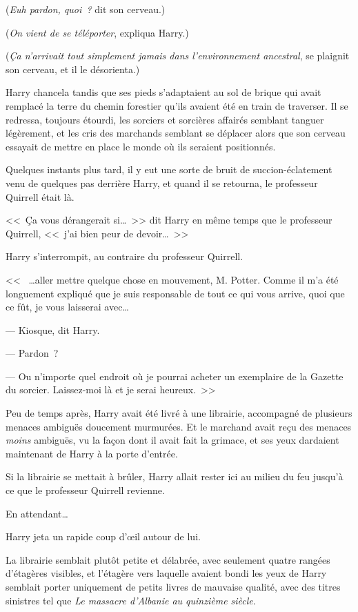 (\emph{Euh pardon, quoi~?} dit son cerveau.)

(\emph{On vient de se téléporter}, expliqua Harry.)

(\emph{Ça n'arrivait tout simplement jamais dans l'environnement ancestral}, se plaignit son cerveau, et il le désorienta.)

Harry chancela tandis que ses pieds s'adaptaient au sol de brique qui avait remplacé la terre du chemin forestier qu'ils avaient été en train de traverser. Il se redressa, toujours étourdi, les sorciers et sorcières affairés semblant tanguer légèrement, et les cris des marchands semblant se déplacer alors que son cerveau essayait de mettre en place le monde où ils seraient positionnés.

Quelques instants plus tard, il y eut une sorte de bruit de succion-éclatement venu de quelques pas derrière Harry, et quand il se retourna, le professeur Quirrell était là.

<<~Ça vous dérangerait si…~>> dit Harry en même temps que le professeur Quirrell, <<~j'ai bien peur de devoir…~>>

Harry s'interrompit, au contraire du professeur Quirrell.

<<~ …aller mettre quelque chose en mouvement, M. Potter. Comme il m'a été longuement expliqué que je suis responsable de tout ce qui vous arrive, quoi que ce fût, je vous laisserai avec…

--- Kiosque, dit Harry.

--- Pardon~?

--- Ou n'importe quel endroit où je pourrai acheter un exemplaire de la Gazette du sorcier. Laissez-moi là et je serai heureux.~>>

Peu de temps après, Harry avait été livré à une librairie, accompagné de plusieurs menaces ambiguës doucement murmurées. Et le marchand avait reçu des menaces \emph{moins} ambiguës, vu la façon dont il avait fait la grimace, et ses yeux dardaient maintenant de Harry à la porte d'entrée.

Si la librairie se mettait à brûler, Harry allait rester ici au milieu du feu jusqu'à ce que le professeur Quirrell revienne.

En attendant…

Harry jeta un rapide coup d'œil autour de lui.

La librairie semblait plutôt petite et délabrée, avec seulement quatre rangées d'étagères visibles, et l'étagère vers laquelle avaient bondi les yeux de Harry semblait porter uniquement de petits livres de mauvaise qualité, avec des titres sinistres tel que \emph{Le massacre d'Albanie au quinzième siècle}.

